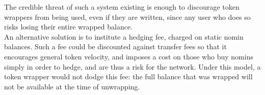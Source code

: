 \noindent The credible threat of such a system existing is enough to
discourage token wrappers from being used, even if they are written, since
any user who does so risks losing their entire wrapped balance. \\

\noindent An alternative solution is to institute a hedging fee, charged on static nomin
balances. Such a fee could be discounted against transfer fees so that it
encourages general token velocity, and imposes a cost on those who buy nomins
simply in order to hedge, and are thus a risk for the network. Under this
model, a token wrapper would not dodge this fee: the full balance that was
wrapped will not be available at the time of unwrapping.

